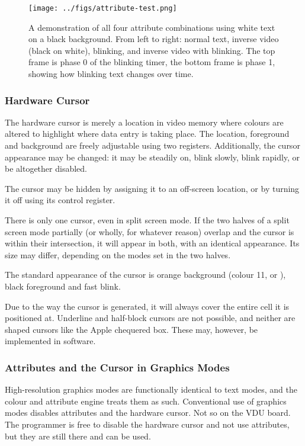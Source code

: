 \begin{figure}
  \centering
  \texttt{[image: ../figs/attribute-test.png]}
  \caption[Demonstration of Attributes]{\label{fig:attributes}A demonstration
    of all four attribute combinations using white text on a black
    background. From left to right: normal text, inverse video (black on
    white), blinking, and inverse video with blinking. The top frame is phase 0 of the
    blinking timer, the bottom frame is phase 1, showing how blinking text
    changes over time.}
\end{figure}


\subsubsection{Hardware Cursor}
\label{sec:vdu:cursor}

The hardware cursor is merely a location in video memory where colours are
altered to highlight where data entry is taking place. The location, foreground
and background are freely adjustable using two registers. Additionally, the
cursor appearance may be changed: it may be steadily on, blink slowly, blink
rapidly, or be altogether disabled.

The cursor may be hidden by assigning it to an off-screen location, or by
turning it off using its control register.

There is only one cursor, even in split screen mode. If the two halves of a
split screen mode partially (or wholly, for whatever reason) overlap and the
cursor is within their intersection, it will appear in both, with an identical
appearance. Its size may differ, depending on the modes set in the two halves.

The standard appearance of the cursor is orange background (colour 11, or
), black foreground and fast blink.

Due to the way the cursor is generated, it will always cover the entire cell it
is positioned at. Underline and half-block cursors are not possible, and
neither are shaped cursors like the Apple chequered box. These may, however, be
implemented in software.

\subsubsection{Attributes and the Cursor in Graphics Modes}

High-resolution graphics modes are functionally identical to text modes, and
the colour and attribute engine treats them as such. Conventional use of
graphics modes disables attributes and the hardware cursor. Not so on the VDU
board. The programmer is free to disable the hardware cursor and not use
attributes, but they are still there and can be used.

